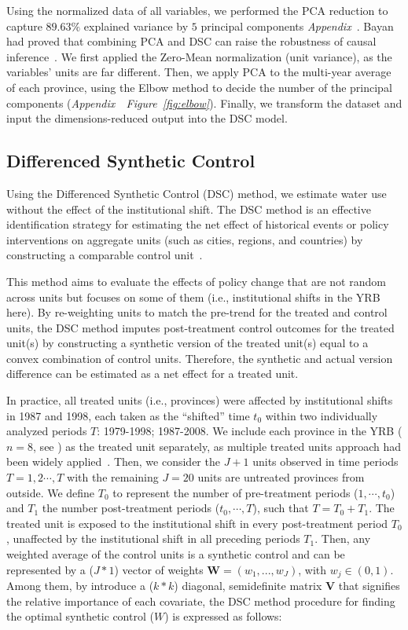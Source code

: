 Using the normalized data of all variables, we performed the PCA reduction to capture $89.63\%$ explained variance by $5$ principal components \textit{Appendix~}. Bayan had proved that combining PCA and DSC can raise the robustness of causal inference~\cite{bayani2021}. We first applied the Zero-Mean normalization (unit variance), as the variables' units are far different. Then, we apply PCA to the multi-year average of each province, using the Elbow method to decide the number of the principal components (\textit{Appendix~~Figure~\ref{fig:elbow}}). Finally, we transform the dataset and input the dimensions-reduced output into the DSC model.


\subsection{Differenced Synthetic Control}\label{sec:DSC}
Using the Differenced Synthetic Control (DSC) method, we estimate water use without the effect of the institutional shift.
The DSC method is an effective identification strategy for estimating the net effect of historical events or policy interventions on aggregate units (such as cities, regions, and countries) by constructing a comparable control unit~\cite{abadie2010, abadie2015, hill2021}.

This method aims to evaluate the effects of policy change that are not random across units but focuses on some of them (i.e., institutional shifts in the YRB here).
By re-weighting units to match the pre-trend for the treated and control units, the DSC method imputes post-treatment control outcomes for the treated unit(s) by constructing a synthetic version of the treated unit(s) equal to a convex combination of control units.
Therefore, the synthetic and actual version difference can be estimated as a net effect for a treated unit.

In practice, all treated units (i.e., provinces) were affected by institutional shifts in 1987 and 1998, each taken as the ``shifted'' time $t_0$ within two individually analyzed periods $T$: 1979-1998; 1987-2008.
We include each province in the YRB ($n=8$, see \textit{}) as the treated unit separately, as multiple treated units approach had been widely applied~\cite{abadie2021}.
Then, we consider the $J+1$ units observed in time periods $T = {1,2 \cdots , T}$ with the remaining $J=20$ units are untreated provinces from outside.
We define $T_0$ to represent the number of pre-treatment periods ($1,\cdots,t_0$) and $T_1$ the number post-treatment periods ($t_0,\cdots,T$), such that $T = T_0+ T_1$.
The treated unit is exposed to the institutional shift in every post-treatment period $T_0$, unaffected by the institutional shift in all preceding periods $T_1$.
Then, any weighted average of the control units is a synthetic control and can be represented by a ($J * 1$) vector of weights $\mathbf{W} = (w_{1},...,w_{J})$, with $w_j \in (0, 1)$.
Among them, by introduce a ($k * k$) diagonal, semidefinite matrix $\mathbf{V}$ that signifies the relative importance of each covariate, the DSC method procedure for finding the optimal synthetic control ($W$) is expressed as follows:

